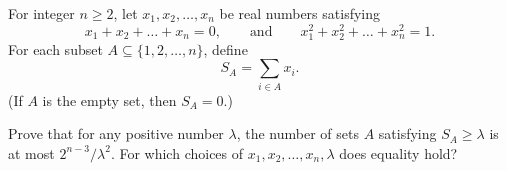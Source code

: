For integer $n\geq2$,  let $x_1, x_2, \ldots, x_n$ be real numbers satisfying \[x_1+x_2+\ldots+x_n=0, \qquad \text{and}\qquad x_1^2+x_2^2+\ldots+x_n^2=1.\]For each subset $A\subseteq\{1, 2, \ldots, n\}$,  define\[S_A=\sum_{i\in A}x_i.\](If $A$ is the empty set, then $S_A=0$.)

Prove that for any positive number $\lambda$,  the number of sets $A$ satisfying $S_A\geq\lambda$ is at most $2^{n-3}/\lambda^2$.  For which choices of $x_1, x_2, \ldots, x_n, \lambda$ does equality hold?